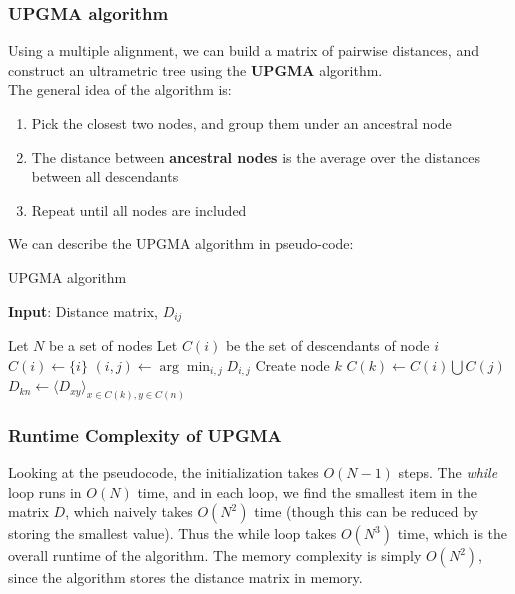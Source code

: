 \documentclass[12pt]{article}
\begin{document}
\subsubsection{UPGMA algorithm}
Using a multiple alignment, we can build a matrix of pairwise distances, and construct an ultrametric tree using the \textbf{UPGMA} algorithm.\\[10pt]
The general idea of the algorithm is:
\begin{enumerate}
    \item Pick the closest two nodes, and group them under an ancestral node
    \item The distance between \textbf{ancestral nodes} is the average over the distances between all descendants
    \item Repeat until all nodes are included
\end{enumerate}
We can describe the UPGMA algorithm in pseudo-code:
\begin{algorithm}
\caption{UPGMA algorithm}
\hspace*{\algorithmicindent} \textbf{Input}: Distance matrix, $D_{ij}$
\begin{algorithmic}
\State Let $N$ be a set of nodes
\State Let $C(i)$ be the set of descendants of node $i$
    \State$C(i) \leftarrow \{i\}$
\EndFor
{}
    \State $(i, j) \leftarrow \arg\min_{i,j}D_{i,j}$
    \State Create node $k$
    \State $C(k) \leftarrow C(i) \bigcup C(j)$
        \State $D_{kn} \leftarrow \langle D_{xy}\rangle_{x\in C(k), y\in C(n)}$
    \EndFor
\EndWhile
\end{algorithmic}
\end{algorithm}
\subsubsection{Runtime Complexity of UPGMA}
Looking at the pseudocode, the initialization takes $O(N-1)$ steps. The \textit{while} loop runs in $O(N)$ time, and in each loop, we find the smallest item in the matrix $D$, which naively takes $O(N^2)$ time (though this can be reduced by storing the smallest value). Thus the while loop takes $O(N^3)$ time, which is the overall runtime of the algorithm. The memory complexity is simply $O(N^2)$, since the algorithm stores the distance matrix in memory.
\end{document}
